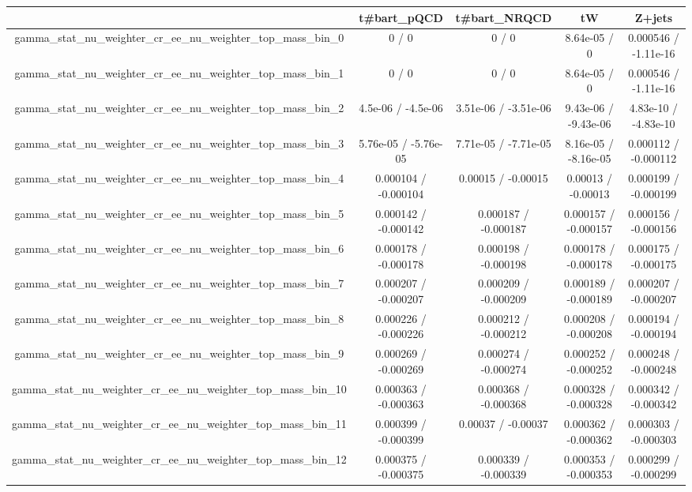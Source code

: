\documentclass[10pt]{article}
\begin{document}
\begin{table}[htbp]
\begin{center}
\begin{tabular}{|c|c|c|c|c|}
\hline 
      & t#bar{t}_{pQCD}      & t#bar{t}_{NRQCD}      & tW      & Z+jets \\ 
\hline 
  gamma_stat_nu_weighter_cr_ee_nu_weighter_top_mass_bin_0 & 0 / 0 & 0 / 0 & 8.64e-05 / 0 & 0.000546 / -1.11e-16 \\ 
  gamma_stat_nu_weighter_cr_ee_nu_weighter_top_mass_bin_1 & 0 / 0 & 0 / 0 & 8.64e-05 / 0 & 0.000546 / -1.11e-16 \\ 
  gamma_stat_nu_weighter_cr_ee_nu_weighter_top_mass_bin_2 & 4.5e-06 / -4.5e-06 & 3.51e-06 / -3.51e-06 & 9.43e-06 / -9.43e-06 & 4.83e-10 / -4.83e-10 \\ 
  gamma_stat_nu_weighter_cr_ee_nu_weighter_top_mass_bin_3 & 5.76e-05 / -5.76e-05 & 7.71e-05 / -7.71e-05 & 8.16e-05 / -8.16e-05 & 0.000112 / -0.000112 \\ 
  gamma_stat_nu_weighter_cr_ee_nu_weighter_top_mass_bin_4 & 0.000104 / -0.000104 & 0.00015 / -0.00015 & 0.00013 / -0.00013 & 0.000199 / -0.000199 \\ 
  gamma_stat_nu_weighter_cr_ee_nu_weighter_top_mass_bin_5 & 0.000142 / -0.000142 & 0.000187 / -0.000187 & 0.000157 / -0.000157 & 0.000156 / -0.000156 \\ 
  gamma_stat_nu_weighter_cr_ee_nu_weighter_top_mass_bin_6 & 0.000178 / -0.000178 & 0.000198 / -0.000198 & 0.000178 / -0.000178 & 0.000175 / -0.000175 \\ 
  gamma_stat_nu_weighter_cr_ee_nu_weighter_top_mass_bin_7 & 0.000207 / -0.000207 & 0.000209 / -0.000209 & 0.000189 / -0.000189 & 0.000207 / -0.000207 \\ 
  gamma_stat_nu_weighter_cr_ee_nu_weighter_top_mass_bin_8 & 0.000226 / -0.000226 & 0.000212 / -0.000212 & 0.000208 / -0.000208 & 0.000194 / -0.000194 \\ 
  gamma_stat_nu_weighter_cr_ee_nu_weighter_top_mass_bin_9 & 0.000269 / -0.000269 & 0.000274 / -0.000274 & 0.000252 / -0.000252 & 0.000248 / -0.000248 \\ 
  gamma_stat_nu_weighter_cr_ee_nu_weighter_top_mass_bin_10 & 0.000363 / -0.000363 & 0.000368 / -0.000368 & 0.000328 / -0.000328 & 0.000342 / -0.000342 \\ 
  gamma_stat_nu_weighter_cr_ee_nu_weighter_top_mass_bin_11 & 0.000399 / -0.000399 & 0.00037 / -0.00037 & 0.000362 / -0.000362 & 0.000303 / -0.000303 \\ 
  gamma_stat_nu_weighter_cr_ee_nu_weighter_top_mass_bin_12 & 0.000375 / -0.000375 & 0.000339 / -0.000339 & 0.000353 / -0.000353 & 0.000299 / -0.000299 \\ 

\end{tabular}
\end{center}
\end{table}
\end{document}
